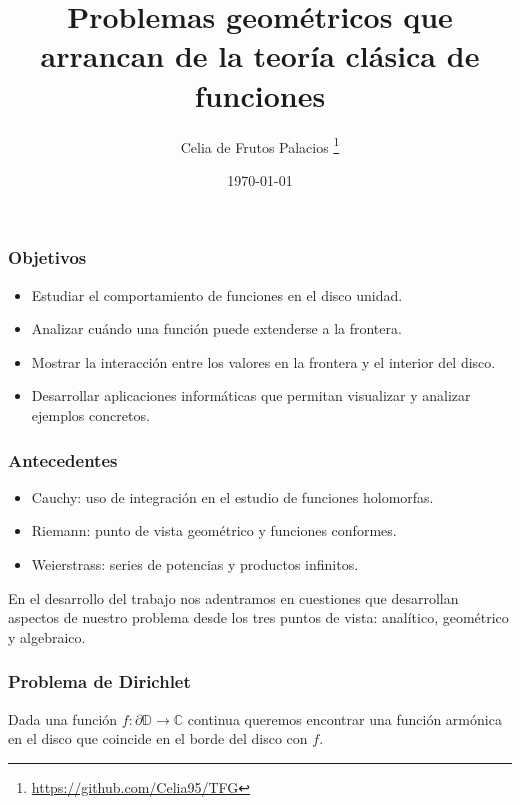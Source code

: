 \documentclass[spanish, a4paper, 12pt, final, slideColor, nototal, colorBG, pdf, noaccumulate, darkblue]{beamer}
\title{Problemas geométricos que arrancan de la teoría clásica de funciones}
\author{Celia de Frutos Palacios \thanks{\url{https://github.com/Celia95/TFG}}}
\subtitle{}
\institute[UCM]{}
\date{\today}
\newcommand{\complex}{\mathbb{C}}
\newcommand{\disk}{\mathbb{D}}
\begin{document}
\maketitle

\begin{frame}
    \frametitle{Objetivos}
    \begin{itemize}
        \item Estudiar el comportamiento de funciones en el disco unidad.
        \item Analizar cuándo una función puede extenderse a la frontera.
        \item Mostrar la interacción entre los valores en la frontera y el interior del disco.
        \item Desarrollar aplicaciones informáticas que permitan visualizar y analizar ejemplos concretos.
    \end{itemize}
\end{frame}

\begin{frame}
    \frametitle{Antecedentes}
    \begin{itemize}
        \item Cauchy: uso de integración en el estudio de funciones holomorfas.
        \item Riemann: punto de vista geométrico y funciones conformes.
        \item Weierstrass: series de potencias y productos infinitos.
    \end{itemize}
    En el desarrollo del trabajo nos adentramos en cuestiones que desarrollan aspectos de nuestro problema desde los tres puntos de vista: analítico, geométrico y algebraico.
\end{frame}

\begin{frame}
    \frametitle{Problema de Dirichlet}
    \begin{block}{}
        Dada una función $f: \partial \disk \to \complex$ continua queremos encontrar una función armónica en el disco que coincide en el borde del disco con $f$.
    \end{block}
\end{frame}
\end{document}
